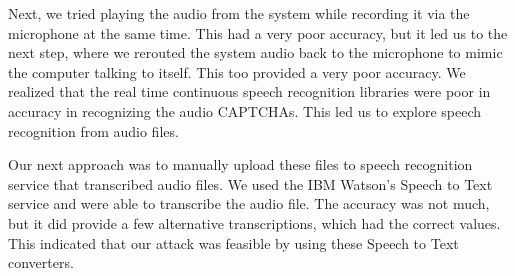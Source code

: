 Next, we tried playing the audio from the system while recording it via the microphone at the same time. This had a very poor accuracy, but it led us to the next step, where we rerouted the system audio back to the microphone to mimic the computer talking to itself. This too provided a very poor accuracy. We realized that the real time continuous speech recognition libraries were poor in accuracy in recognizing the audio CAPTCHAs. This led us to explore speech recognition from audio files. \newline

Our next approach was to manually upload these files to speech recognition service that transcribed audio files. We used the IBM Watson's Speech to Text service and were able to transcribe the audio file. The accuracy was not much, but it did provide a few alternative transcriptions, which had the correct values. This indicated that our attack was feasible by using these Speech to Text converters.